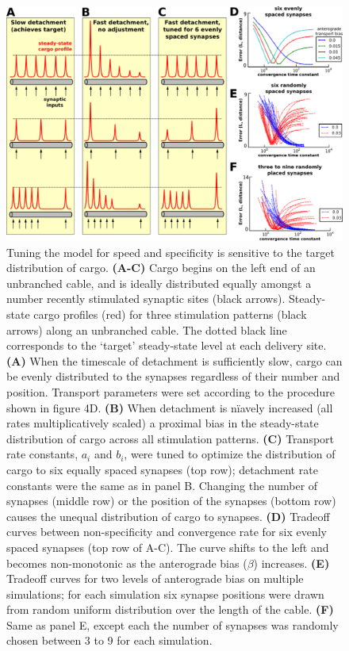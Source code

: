 \documentclass[11pt]{wlpeerj}
\begin{document}
\begin{figure}[!tb]
\begin{center}
\includegraphics[width=0.9\columnwidth]{06_heterosynaptic_cable.png}
\caption{Tuning the model for speed and specificity is sensitive to the target distribution of cargo.
\textbf{(A-C)} Cargo begins on the left end of an unbranched cable, and is ideally distributed equally amongst a number recently stimulated synaptic sites (black arrows). Steady-state cargo profiles (red) for three stimulation patterns (black arrows) along an unbranched cable. The dotted black line corresponds to the `target' steady-state level at each delivery site.
\textbf{(A)} When the timescale of detachment is sufficiently slow, cargo can be evenly distributed to the synapses regardless of their number and position. Transport parameters were set according to the procedure shown in figure 4D.
\textbf{(B)} When detachment is n\"iavely increased (all rates multiplicatively scaled) a proximal bias in the steady-state distribution of cargo across all stimulation patterns.
\textbf{(C)} Transport rate constants, $a_i$ and $b_i$, were tuned to optimize the distribution of cargo to six equally spaced synapses (top row); detachment rate constants were the same as in panel B. Changing the number of synapses (middle row) or the position of the synapses (bottom row) causes the unequal distribution of cargo to synapses.
\textbf{(D)} Tradeoff curves between non-specificity and convergence rate for six evenly spaced synapses (top row of A-C). The curve shifts to the left and becomes non-monotonic as the anterograde bias ($\beta$) increases.
\textbf{(E)} Tradeoff curves for two levels of anterograde bias on multiple simulations; for each simulation six synapse positions were drawn from random uniform distribution over the length of the cable.
\textbf{(F)} Same as panel E, except each the number of synapses was randomly chosen between 3 to 9 for each simulation.
}
\end{center}
\end{figure}
\end{document}
